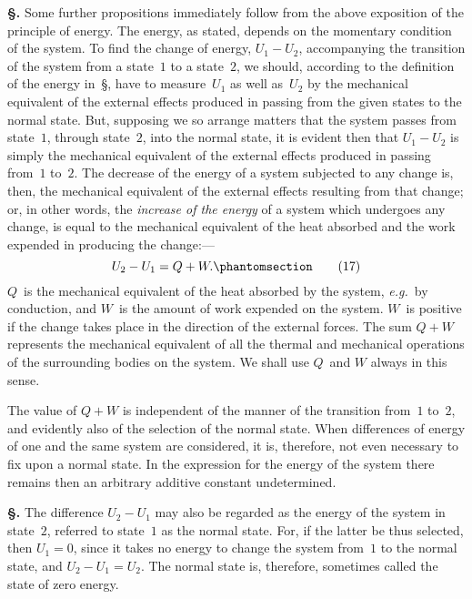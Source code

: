 \documentclass[12pt]{book}[2005/09/16]
\newcommand{\Chg}[2]{#2}
\newcommand{\Add}[1]{\Chg{}{#1}}
\newcommand{\Section}[1]{
  \medskip\par\textbf{§\;#1}
  \label{section:#1}
}
\newcommand{\SecRef}[2][§\;]{\hyperref[section:#2.]{{\upshape #1#2}}}
\newcommand{\Tag}[1]{%
  \phantomsection\label{eqn:#1}\tag*{\ensuremath{#1}}%
}
\newcommand{\PageSep}[1]{\ignorespaces}
\newcommand{\eg}{\emph{e.g.}}
\begin{document}
\Section{63.} Some further propositions immediately follow from
%
the above exposition of the principle of energy. The
energy, as stated, depends on the momentary condition of
the system. To find the change of energy, $U_{1} - U_{2}$,
accompanying the transition of the system from a state~$1$
\PageSep{43}
to a state~$2$, we should, according to the definition of the
energy in~\SecRef{58}, have to measure~$U_{1}$ as well as~$U_{2}$ by the
%
mechanical equivalent of the external effects produced in
passing from the given states to the normal state. But,
supposing we so arrange matters that the system passes
from state~$1$, through state~$2$, into the normal state, it is
evident then that $U_{1} - U_{2}$ is simply the mechanical equivalent
of the external effects produced in passing from~$1$ to~$2$.
The decrease of the energy of a system subjected to any
change is, then, the mechanical equivalent of the external
effects resulting from that change; or, in other words, the
\emph{increase of the energy} of a system which undergoes any
change, is equal to the mechanical equivalent of the heat
absorbed and the work expended in producing the change:\Add{---}
\[
U_{2} - U_{1} = Q + W\Add{.}
\Tag{(17)}
\]
$Q$~is the mechanical equivalent of the heat absorbed by the
system, \eg\ by conduction, and $W$~is the amount of work
expended on the system. $W$~is positive if the change takes
place in the direction of the external forces. The sum
$Q + W$ represents the mechanical equivalent of all the
thermal and mechanical operations of the surrounding
bodies on the system. We shall use $Q$~and $W$ always in
this sense.

The value of $Q + W$ is independent of the manner of
the transition from~$1$ to~$2$, and evidently also of the selection
of the normal state. When differences of energy of
one and the same system are considered, it is, therefore, not
even necessary to fix upon a normal state. In the expression
for the energy of the system there remains then an
arbitrary additive constant undetermined.

\Section{64.} The difference $U_{2} - U_{1}$ may also be regarded as
the energy of the system in state~$2$, referred to state~$1$ as
the normal state. For, if the latter be thus selected, then
$U_{1} = 0$, since it takes no energy to change the system from~$1$
to the normal state, and $U_{2} - U_{1} = U_{2}$. The normal
\PageSep{44}
state is, therefore, sometimes called the state of zero
%
energy.
%
\end{document}
